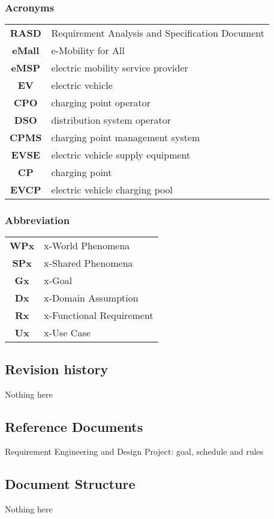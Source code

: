 \subsubsection*{Acronyms}
\begin{table}[H]
    \begin{tabularx}{\textwidth}{cX}
        \toprule
        \textbf{RASD}  & Requirement Analysis and Specification Document \\
        \textbf{eMall} & e-Mobility for All                              \\
        \textbf{eMSP}  & electric mobility service provider              \\
        \textbf{EV}    & electric vehicle                                \\
        \textbf{CPO}   & charging point operator                         \\
        \textbf{DSO}   & distribution system operator                    \\
        \textbf{CPMS}  & charging point management system                \\
        \textbf{EVSE}  & electric vehicle supply equipment               \\
        \textbf{CP}    & charging point                                  \\
        \textbf{EVCP}  & electric vehicle charging pool                  \\ \bottomrule
    \end{tabularx}
\end{table}
\subsubsection*{Abbreviation}
\begin{table}[H]
    \begin{tabularx}{\textwidth}{cX}
        \toprule
        \textbf{WPx} & x-World Phenomena        \\
        \textbf{SPx} & x-Shared Phenomena       \\
        \textbf{Gx}  & x-Goal                   \\
        \textbf{Dx}  & x-Domain Assumption      \\
        \textbf{Rx}  & x-Functional Requirement \\
        \textbf{Ux}  & x-Use Case               \\ \bottomrule
    \end{tabularx}
\end{table}
\subsection{Revision history}
Nothing here

\subsection{Reference Documents}
Requirement Engineering and Design Project: goal, schedule and rules


\subsection{Document Structure}
Nothing here
